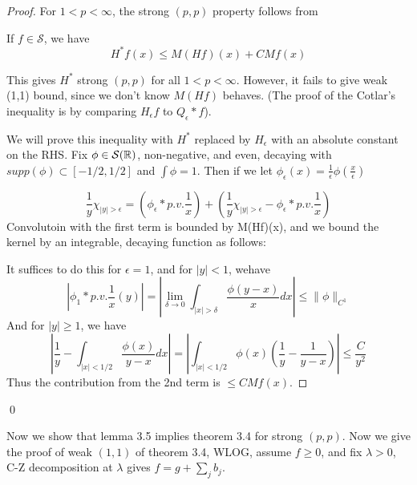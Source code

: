 \begin{proof}
    For $1<p<\infty$, the strong $(p,p)$ property follows from
    \begin{lemma}
        If $f\in\mathcal{S}$, we have
        \begin{equation*}
            H^* f(x)\leq M(Hf)(x)+CMf(x)
        \end{equation*}
    \end{lemma}
    This gives $H^*$ strong $(p,p)$ for all $1<p<\infty$. However, it fails to give weak (1,1) bound, since we don't know $M(Hf)$ behaves. (The proof of the Cotlar's inequality is by comparing $H_\epsilon f$ to $Q_\epsilon\ast f$).

    We will prove this inequality with $H^*$ replaced by $H_\epsilon$ with an absolute constant on the RHS. Fix $\phi\in\mathcal{S}(\mathbb{R})$, non-negative, and even, decaying with $supp(\phi)\subset [-1/2, 1/2]$ and $\int\phi=1$. Then if we let $\phi_\epsilon(x)=\frac{1}{\epsilon}\phi\left(\frac{x}{\epsilon}\right)$

    \begin{equation*}
        \frac{1}{y}\chi_{|y|>\epsilon}=(\phi_\epsilon\ast p.v.\frac{1}{x})+\left(\frac{1}{y}\chi_{|y|>\epsilon}-\phi_\epsilon\ast p.v.\frac{1}{x}\right)
    \end{equation*}
    Convolutoin with the first term is bounded by M(Hf)(x), and we bound the kernel by an integrable, decaying function as follows:

    It suffices to do this for $\epsilon=1$, and for $|y|<1$, wehave
    \begin{equation*}
        |\phi_1\ast p.v.\frac{1}{x}(y)|=\left|\lim_{\delta\to 0}\int_{|x|>\delta}\frac{\phi(y-x)}{x}dx\right|\leq\|\phi\|_{C^1}
    \end{equation*}
    And for $|y|\geq 1$, we have
    \begin{equation*}
        \left|\frac{1}{y}-\int_{|x|<1/2}\frac{\phi(x)}{y-x}dx\right|=\left|\int_{|x|<1/2}\phi(x)\left(\frac{1}{y}-\frac{1}{y-x}\right) \right|\leq\frac{C}{y^2}
    \end{equation*}
    Thus the contribution from the 2nd term is $\leq CMf(x)$.
    
\end{proof}
\qed

Now we show that lemma 3.5 implies theorem 3.4 for strong $(p,p)$. Now we give the proof of weak $(1,1)$ of theorem 3.4, WLOG, assume $f\geq 0$, and fix $\lambda>0$, C-Z decomposition at $\lambda$ gives $f=g+\sum_jb_j$.

